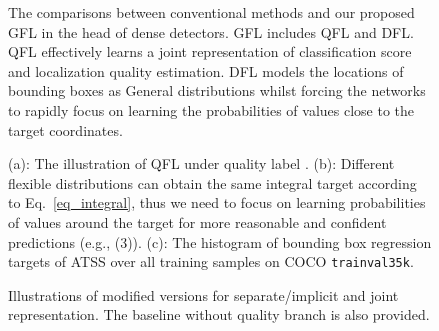 \documentclass{article}
\begin{document}
\begin{figure}[t]
	\begin{center}
		\setlength{\fboxrule}{0pt}
	\end{center}	
	\vspace{-12pt}
	\caption{The comparisons between conventional methods and our proposed GFL in the head of dense detectors. GFL includes QFL and DFL. QFL effectively learns a joint representation of classification score and localization quality estimation. DFL models the locations of bounding boxes as General distributions whilst forcing the networks to rapidly focus on learning the probabilities of values close to the target coordinates. } \label{fig_gfocal_cropped}
	\vspace{-12pt}
\end{figure}
\begin{figure}[t]
    \vspace{0pt}
	\begin{center}
		\setlength{\fboxrule}{0pt}
	\end{center}
	\vspace{-12pt}
	\caption{(a): The illustration of QFL under quality label . (b): Different flexible distributions can obtain the same integral target according to Eq.~\eqref{eq_integral}, thus we need to focus on learning probabilities of values around the target for more reasonable and confident predictions (e.g., (3)). (c): The histogram of bounding box regression targets of ATSS over all training samples on COCO {\tt trainval35k}.}
	\label{fig_fcos_atss_reg_cropped}
	\vspace{-8pt}
\end{figure}


\begin{figure}[t]
\begin{center}
		\setlength{\fboxrule}{0pt}
	\end{center}	
	\vspace{-10pt}
	\caption{Illustrations of modified versions for separate/implicit and joint representation. The baseline without quality branch is also provided.}
	\label{fig_QFL_compare_cropped}
	\vspace{-12pt}
\end{figure}
\end{document}
